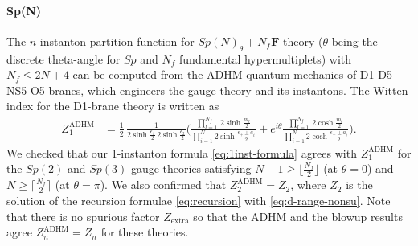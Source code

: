 \documentclass[letterpaper, 11pt]{article}
\def\e{\epsilon}
\begin{document}
{\paragraph{Sp(N)}
The $n$-instanton partition function for $Sp(N)_\theta + N_f \mathbf{F}$ theory ($\theta$ being the discrete theta-angle for $Sp$ and $N_f$ fundamental hypermultiplets) with $N_f \leq 2N+4$ can be computed from the ADHM quantum mechanics of D1-D5-NS5-O5 branes, which engineers the gauge theory and its instantons. The Witten index for the D1-brane theory is written as
\begin{align}
  Z_1^\text{ADHM} &= \frac{1}{2}\,\frac{1}{2\sinh\frac{\e_1}{2}\,2\sinh\frac{\e_2}{2}}\Bigg(\frac{\prod_{l=1}^{N_f}\,2\sinh\frac{m_l}{2}}{\prod_{i=1}^{N}2\sinh\frac{\e_+\pm a_i}{2}}+e^{i\theta}\frac{\prod_{l=1}^{N_f}\,2\cosh\frac{m_l}{2}}{\prod_{i=1}^{N}2\cosh\frac{\e_+\pm a_i}{2}}\Bigg).
\end{align}
We checked that our 1-instanton formula \eqref{eq:1inst-formula} agrees with $Z_1^\text{ADHM}$ for the $Sp(2)$ and $Sp(3)$ gauge theories satisfying $N-1 \geq \lfloor \frac{N_f}{2} \rfloor$ (at $\theta = 0$) and $N \geq \lceil \frac{N_f}{2} \rceil$ (at $\theta = \pi$). 
We also confirmed that $Z_2^\text{ADHM} =  Z_2$, where $Z_2$ is the solution of the recursion formulae \eqref{eq:recursion} with \eqref{eq:d-range-nonsu}. Note that there is no spurious factor $Z_\text{extra}$ so that the ADHM and the blowup results agree $Z_n^\text{ADHM} = Z_n $ for these theories.


}
\end{document}
